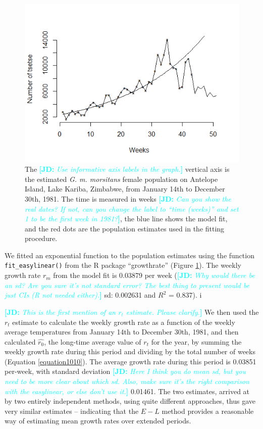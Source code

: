 \documentclass[12pt,a4paper]{article}
\newcommand{\comment}[3]{\textcolor{#1}{\textbf{[#2: }\textsl{#3}\textbf{]}}}
\newcommand{\jd}[1]{\comment{cyan}{JD}{#1}}
\begin{document}
\begin{figure}[hbt!]
	\centering
	\includegraphics[width=0.9\linewidth]{Feb_06_fitGrouwthRate}
	\caption{The \jd{Use informative axis labels in the graph.} vertical axis is the estimated \textit{G. m. morsitans} female population on Antelope Island, Lake Kariba, Zimbabwe, from January 14th to December 30th, 1981. The time is measured in weeks \jd{Can you show the real dates? If not, can you change the label to “time (weeks)” and set 1 to be the first week in 1981?}, the blue line shows the model fit, and the red dots are the population estimates used in the fitting procedure.}
	\label{fig:antelopeEst}
\end{figure}

We fitted an exponential function to the population estimates using the function \texttt{fit\_easylinear()} from the R package “growthrate” (Figure \ref{fig:antelopeEst}). The weekly growth rate $r_m$ from the model fit is 0.03879 per week (\jd{Why would there be an sd? Are you sure it's not standard error? The best thing to present would be just CIs (R not needed either).} sd: 0.002631 and $R^2$ = 0.837). i

\jd{This is the first mention of an $r_t$ estimate. Please clarify.}
We then used the $r_t$ estimate to calculate the weekly growth rate as a function of the weekly average temperatures from January 14th to December 30th, 1981, and then calculated $\hat{r_0}$, the long-time average value of $r_t$ for the year, by summing the weekly growth rate during this period and dividing by the total number of weeks (Equation \ref{equation1010}). The average growth rate during this period is 0.03851 per-week, with standard deviation \jd{Here I think you do mean sd, but you need to be more clear about which sd. Also, make sure it's the right comparison with the easylinear, or else don't use it.} 0.01461. The two estimates, arrived at by two entirely independent methods, using quite different approaches, thus gave very similar estimates – indicating that the $E-L$ method provides a reasonable way of estimating mean  growth rates over extended periods.
\end{document}
